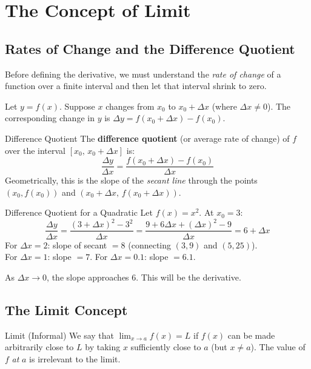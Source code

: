 \documentclass[12pt, a4paper]{article}
\theoremstyle{definition}
\newcommand{\limit}[2]{\lim_{#1 \to #2}}
\begin{document}
\section{The Concept of Limit}

\subsection{Rates of Change and the Difference Quotient}

Before defining the derivative, we must understand the \emph{rate of change}
of a function over a finite interval and then let that interval shrink to zero.

Let $y = f(x)$.  Suppose $x$ changes from $x_0$ to $x_0 + \Delta x$ (where
$\Delta x \neq 0$).  The corresponding change in $y$ is
$\Delta y = f(x_0 + \Delta x) - f(x_0)$.

\begin{defbox}{Difference Quotient}
The \textbf{difference quotient} (or average rate of change) of $f$ over the
interval $[x_0,\, x_0+\Delta x]$ is:
\[
  \frac{\Delta y}{\Delta x}
  = \frac{f(x_0 + \Delta x) - f(x_0)}{\Delta x}
\]
Geometrically, this is the slope of the \emph{secant line} through the points
$(x_0, f(x_0))$ and $(x_0+\Delta x,\, f(x_0+\Delta x))$.
\end{defbox}

\begin{exbox}{Difference Quotient for a Quadratic}
Let $f(x) = x^2$.  At $x_0 = 3$:
\[
  \frac{\Delta y}{\Delta x}
  = \frac{(3+\Delta x)^2 - 3^2}{\Delta x}
  = \frac{9 + 6\Delta x + (\Delta x)^2 - 9}{\Delta x}
  = 6 + \Delta x
\]
For $\Delta x = 2$: slope of secant $= 8$ (connecting $(3,9)$ and $(5,25)$).\\
For $\Delta x = 1$: slope $= 7$. \quad For $\Delta x = 0.1$: slope $= 6.1$.

As $\Delta x \to 0$, the slope approaches 6.  This will be the derivative.
\end{exbox}

\subsection{The Limit Concept}

\begin{defbox}{Limit (Informal)}
We say that $\displaystyle\limit{x}{a} f(x) = L$ if $f(x)$ can be made
arbitrarily close to $L$ by taking $x$ sufficiently close to $a$ (but
$x \neq a$).  The value of $f$ \emph{at} $a$ is irrelevant to the limit.
\end{defbox}
\end{document}
